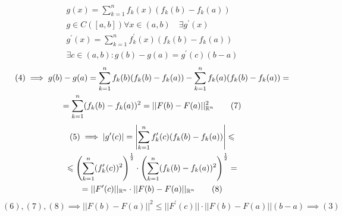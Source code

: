 \documentclass[main]{subfiles}
\begin{document}
    \begin{longProof}
        \begin{gather*}
        g(x) = \sum^n_{k=1} f_k(x)(f_k(b)-f_k(a)) \tag{4}\\
        g \in C([a,b]) \forall x \in (a,b) \quad \exists g^\prime(x) \\
        g^\prime(x) = \sum^n_{k=1} f^\prime_k(x)(f_k(b) - f_k(a)) \tag{5} \\
        \exists c \in (a,b) : g(b) - g(a) = g^\prime(c)(b-a) \tag{6} 
    \end{gather*}
    \begin{multline*}
        (4) \implies g(b) - g(a) = \sum^n_{k=1} f_k(b)(f_k(b)-f_k(a)) - \sum^n_{k=1}f_k(a)(f_k(b)-f_k(a)) = \\
        = \sum^n_{k=1} (f_k(b) - f_k(a))^2 = ||F(b)-F(a)||^2_{\mathbb{R}^n} \tag{7}
    \end{multline*}
    \begin{multline*}
        (5) \implies |g^\prime(c)| = \left| \sum^n_{k=1}f^\prime_k(c)(f_k(b)-f_k(a))\right| \leqslant \\
        \leqslant \left( \sum^n_{k=1} (f^\prime_k(c))^2 \right)^{\frac{1}{2}} \cdot \left( \sum^n_{k=1}(f_k(b)-f_k(a))^2\right)^{\frac{1}{2}} = \\
        = ||F^\prime(c)||_{\mathbb{R}^n} \cdot ||F(b) -F(a)||_{\mathbb{R}^n} \tag{8}
    \end{multline*}
    \[ (6),(7),(8) \implies ||F(b) - F(a)||^2 \leq ||F^\prime(c)|| \cdot ||F(b) - F(a)||(b-a) \implies (3) \] 
\end{longProof}
\end{document}
